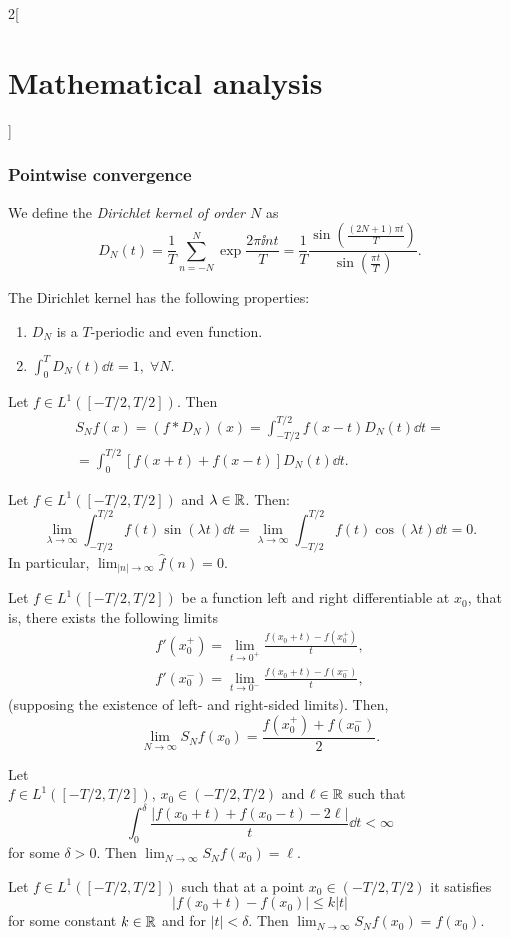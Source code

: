 \documentclass[../../../main.tex]{subfiles}
\begin{document}
\begin{multicols}{2}[\section{Mathematical analysis}]
\subsubsection*{Pointwise convergence}
\begin{definition}
We define the \textit{Dirichlet kernel of order $N$} as $$D_N(t)=\frac{1}{T}\sum_{n=-N}^N\exp{\frac{2\pi\ii nt}{T}}=\frac{1}{T}\frac{\sin\left(\frac{(2N+1)\pi t}{T}\right)}{\sin\left(\frac{\pi t}{T}\right)}.$$
\end{definition}
\begin{prop}
The Dirichlet kernel has the following properties:
\begin{enumerate}
    \item $D_N$ is a $T$-periodic and even function.
    \item $\displaystyle\int_0^TD_N(t)\dd t=1,\;\forall N$.
\end{enumerate}
\end{prop}
\begin{prop}
Let $f\in L^1([-T/2,T/2])$. Then 
\begin{multline*}
    S_Nf(x)=(f*D_N)(x)=\int_{-T/2}^{T/2}f(x-t)D_N(t)\dd t=\\=\int_0^{T/2}[f(x+t)+f(x-t)]D_N(t)\dd t.
\end{multline*}
\end{prop}
\begin{lemma}
Let $f\in L^1([-T/2,T/2])$ and $\lambda\in\mathbb{R} $. Then: $$\lim_{\lambda\to\infty}\int_{-T/2}^{T/2}f(t)\sin(\lambda t)\dd t=\lim_{\lambda\to\infty}\int_{-T/2}^{T/2}f(t)\cos(\lambda t)\dd t=0.$$ In particular, $\displaystyle\lim_{|n|\to\infty}\widehat{f}(n)=0$.
\end{lemma}
\begin{theorem}
Let $f\in L^1([-T/2,T/2])$ be a function left and right differentiable at $x_0$, that is, there exists the following limits
\begin{gather*}f'(x_0^+)=\lim_{t\to0^+}\frac{f(x_0+t)-f(x_0^+)}{t},\\ f'(x_0^-)=\lim_{t\to0^-}\frac{f(x_0+t)-f(x_0^-)}{t},\end{gather*}(supposing the existence of left- and right-sided limits). Then, $$\lim_{N\to\infty}S_Nf(x_0)=\frac{f(x_0^+)+f(x_0^-)}{2}.$$
\end{theorem}
\begin{theorem}
Let \\$f\in L^1([-T/2,T/2])$, $x_0\in (-T/2,T/2)$ and $\ell\in\mathbb{R} $ such that $$\int_0^\delta\frac{|f(x_0+t)+f(x_0-t)-2\ell|}{t}\dd t<\infty$$ for some $\delta>0$. Then $\displaystyle\lim_{N\to\infty}S_Nf(x_0)=\ell$.
\end{theorem}
\begin{theorem}
Let $f\in L^1([-T/2,T/2])$ such that at a point $x_0\in (-T/2,T/2)$ it satisfies $$|f(x_0+t)-f(x_0)|\leq k|t|$$ for some constant $k\in\mathbb{R} $ and for $|t|<\delta$. Then $\displaystyle\lim_{N\to\infty}S_Nf(x_0)=f(x_0)$.
\end{theorem}

\end{multicols}
\end{document}
